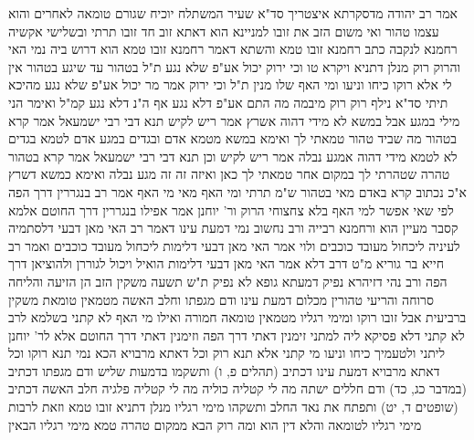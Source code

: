 \documentclass[12pt, openany]{book}
\begin{document}
{אמר רב יהודה מדסקרתא איצטריך סד"א שעיר המשתלח יוכיח שגורם טומאה לאחרים והוא עצמו טהור ואי משום הזב את זובו למניינא הוא דאתא 
זוב חד זובו תרתי ובשלישי אקשיה רחמנא לנקבה 
כתב רחמנא זובו טמא והשתא דאמר רחמנא זובו טמא הוא דרוש ביה נמי האי
והרוק רוק מנלן דתניא {ויקרא טו } וכי ירוק יכול אע"פ שלא נגע ת"ל בטהור עד שיגע בטהור 
אין לי אלא רוקו כיחו וניעו ומי האף שלו מנין ת"ל וכי ירוק 
אמר מר יכול אע"פ שלא נגע מהיכא תיתי 
סד"א נילף רוק רוק מיבמה מה התם אע"פ דלא נגע אף ה"נ דלא נגע קמ"ל 
ואימר הני מילי במגע אבל במשא לא מידי דהוה אשרץ אמר ריש לקיש תנא דבי רבי ישמעאל אמר קרא בטהור מה שביד טהור טמאתי לך 
ואימא במשא מטמא אדם ובגדים במגע אדם לטמא בגדים לא לטמא מידי דהוה אמגע נבלה 
אמר ריש לקיש וכן תנא דבי רבי ישמעאל אמר קרא בטהור טהרה שטהרתי לך במקום אחר טמאתי לך כאן ואיזה זה זה מגע נבלה 
ואימא כמשא דשרץ א"כ נכתוב קרא באדם מאי בטהור ש"מ תרתי
ומי האף מאי מי האף אמר רב בנגררין דרך הפה לפי שאי אפשר למי האף בלא צחצוחי הרוק ור' יוחנן אמר אפילו בנגררין דרך החוטם אלמא קסבר מעיין הוא ורחמנא רבייה 
ורב נחשוב נמי דמעת עינו דאמר רב האי מאן דבעי דלסתמיה לעיניה ליכחול מעובד כוכבים ולוי אמר האי מאן דבעי דלימות ליכחול מעובד כוכבים 
ואמר רב חייא בר גוריא מ"ט דרב דלא אמר האי מאן דבעי דלימות הואיל ויכול לגוררן ולהוציאן דרך הפה ורב נהי דזיהרא נפיק דמעתא גופא לא נפיק 
ת"ש תשעה משקין הזב הן הזיעה והליחה סרוחה והריעי טהורין מכלום דמעת עינו ודם מגפתו וחלב האשה מטמאין טומאת משקין ברביעית אבל זובו רוקו ומימי רגליו מטמאין טומאה חמורה ואילו מי האף לא קתני 
בשלמא לרב לא קתני דלא פסיקא ליה למתני זימנין דאתי דרך הפה וזימנין דאתי דרך החוטם אלא לר' יוחנן ליתני 
ולטעמיך כיחו וניעו מי קתני אלא תנא רוק וכל דאתא מרבויא הכא נמי תנא רוקו וכל דאתא מרבויא 
דמעת עינו דכתיב (תהלים פ, ו) ותשקמו בדמעות שליש ודם מגפתו דכתיב (במדבר כג, כד) ודם חללים ישתה מה לי קטליה כוליה מה לי קטליה פלגיה חלב האשה דכתיב (שופטים ד, יט) ותפתח את נאד החלב ותשקהו 
מימי רגליו מנלן דתניא זובו טמא וזאת לרבות מימי רגליו לטומאה והלא דין הוא ומה רוק הבא ממקום טהרה טמא מימי רגליו הבאין}
\end{document}
